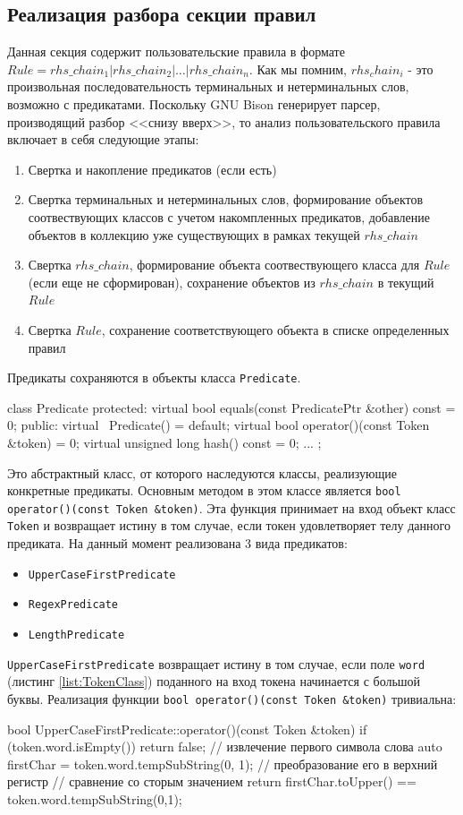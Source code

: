 \subsection{Реализация разбора секции правил}
Данная секция содержит пользовательские правила в формате $Rule = rhs\_chain_1 | rhs\_chain_2 | \dots | rhs\_chain_n$. Как мы помним, $rhs_chain_i$ - это произвольная последовательность терминальных и нетерминальных слов, возможно с предикатами. Поскольку GNU Bison генерирует парсер, производящий разбор <<снизу вверх>>, то анализ пользовательского правила включает в себя следующие этапы:
\begin{enumerate}
  \item Свертка и накопление предикатов (если есть)
  \item Свертка терминальных и нетерминальных слов, формирование объектов соотвествующих классов с учетом накомпленных предикатов, добавление объектов в коллекцию уже существующих в рамках текущей $rhs\_chain$
  \item Свертка $rhs\_chain$, формирование объекта соотвествующего класса для $Rule$ (если еще не сформирован), сохранение объектов из $rhs\_chain$ в текущий $Rule$
  \item Свертка $Rule$, сохранение соответствующего объекта в списке определенных правил
\end{enumerate}
Предикаты сохраняются в объекты класса \lstinline{Predicate}.
\begin{Verb}
class Predicate {
protected:
    virtual bool equals(const PredicatePtr &other) const = 0;
public:
    virtual ~Predicate() = default;
    virtual bool operator()(const Token &token) = 0;
    virtual unsigned long hash() const = 0;
    ...
};
\end{Verb}
Это абстрактный класс, от которого наследуются классы, реализующие конкретные предикаты. Основным методом в этом классе является \lstinline{bool operator()(const Token &token)}. Эта функция принимает на вход объект класс \lstinline{Token} и возвращает истину в том случае, если токен удовлетворяет телу данного предиката. На данный момент реализована 3 вида предикатов:
\begin{itemize}
  \item \lstinline{UpperCaseFirstPredicate}
  \item \lstinline{RegexPredicate}
  \item \lstinline{LengthPredicate}
\end{itemize}

\lstinline{UpperCaseFirstPredicate} возвращает истину в том случае, если поле \lstinline{word} (листинг \ref{list:TokenClass}) поданного на вход токена начинается с большой буквы. Реализация функции \lstinline{bool operator()(const Token &token)} тривиальна:
\begin{Verb}
bool UpperCaseFirstPredicate::operator()(const Token &token) {
    if (token.word.isEmpty()) {
        return false;
    }
    // извлечение первого символа слова
    auto firstChar = token.word.tempSubString(0, 1);
    // преобразование его в верхний регистр
    // сравнение со сторым значением
    return firstChar.toUpper() == token.word.tempSubString(0,1);
}
\end{Verb}


